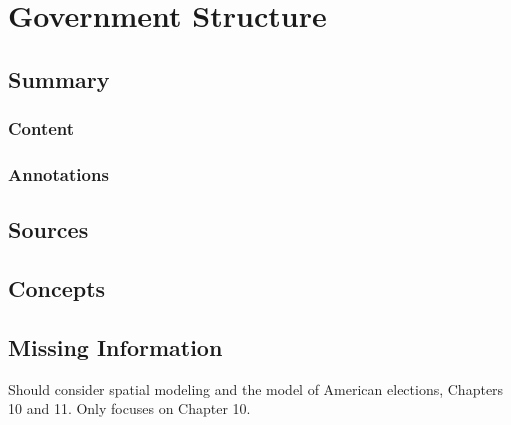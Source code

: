 \chapter{Government Structure}

\section{Summary}

\subsection{Content}


\subsection{Annotations}

\section{Sources}

\section{Concepts}

\section{Missing Information}

Should consider spatial modeling and the model of American elections, Chapters 10 and 11.  Only focuses on Chapter 10.
